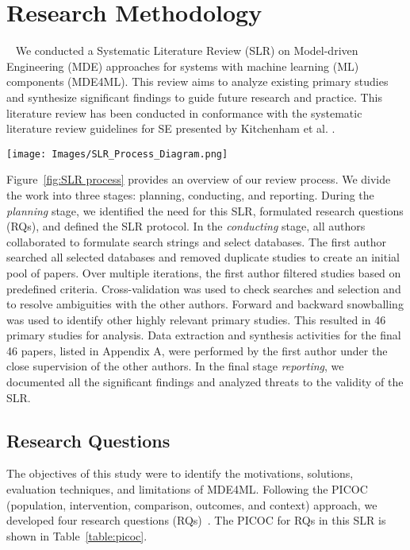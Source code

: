 \section{Research Methodology}~\label{sec:Method}
We conducted a Systematic Literature Review (SLR) on Model-driven Engineering (MDE) approaches for systems with machine learning (ML) components (MDE4ML). This review aims to analyze existing primary studies and synthesize significant findings to guide future research and practice. This literature review has been conducted in conformance with the systematic literature review guidelines for SE presented by Kitchenham et al. \cite{kitchenham2009systematic, kitchenham2007guidelines}. 

\begin{figure*}[ht]
    \centering
    \texttt{[image: Images/SLR\_Process\_Diagram.png]}
    \caption{Systematic Literature Review Process}
    \label{fig:SLR process}
    \vspace*{-1em}
\end{figure*}

Figure~\ref{fig:SLR process} provides an overview of our review process. We divide the work into three stages: planning, conducting, and reporting. During the \textit{planning} stage, we identified the need for this SLR, formulated research questions (RQs), and defined the SLR protocol. %
In the \textit{conducting} stage, all authors collaborated to formulate search strings and select databases. The first author searched all selected databases and removed duplicate studies to create an initial pool of papers. Over multiple iterations, the first author filtered studies based on predefined criteria. Cross-validation was used to check searches and selection and to resolve ambiguities with the other authors. Forward and backward snowballing was used to identify other highly relevant primary studies. This resulted in 46 primary studies for analysis. Data extraction and synthesis activities for the final 46 papers, listed in Appendix A, were performed by the first author under the close supervision of the other authors. In the final stage \textit{reporting}, we documented all the significant findings and analyzed threats to the validity of the SLR.

\subsection{Research Questions}
The objectives of this study were to identify the motivations, solutions, evaluation techniques, and limitations of MDE4ML. Following the PICOC (population, intervention, comparison, outcomes, and context) approach, we developed four research questions (RQs)~\cite{petticrew2008systematic}. The PICOC for RQs in this SLR is shown in Table~\ref{table:picoc}.

